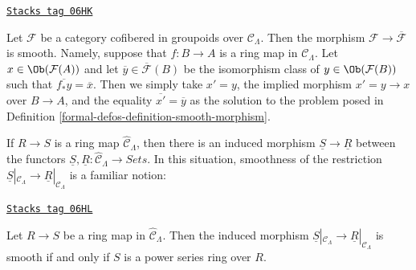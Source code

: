 \begin{remark}
\label{formal-defos-remark-smooth-to-iso-classes}
\href{https://stacks.math.columbia.edu/tag/06HK}{\texttt{Stacks tag 06HK}}

Let $\mathcal{F}$ be a category cofibered in groupoids over
$\mathcal{C}_\Lambda$. Then the morphism
$\mathcal{F} \to \overline{\mathcal{F}}$ is smooth.
Namely, suppose that $f : B \to A$ is a ring map in $\mathcal{C}_\Lambda$.
Let $x \in \Ob(\mathcal{F}(A))$ and let
$\overline{y} \in \overline{\mathcal{F}}(B)$
be the isomorphism class of $y \in \Ob(\mathcal{F}(B))$ such that
$\overline{f_*y} = \overline{x}$. Then we simply take $x' = y$, the
implied morphism $x' = y \to x$ over $B \to A$, and the equality
$\overline{x'} = \overline{y}$ as the solution to
the problem posed in Definition \ref{formal-defos-definition-smooth-morphism}.
\end{remark}

If $R \to S$ is a ring map $\widehat{\mathcal{C}}_\Lambda$, then there
is an induced morphism $\underline{S} \to \underline{R}$ between the
functors $\underline{S}, \underline{R}: \widehat{\mathcal{C}}_\Lambda
\to \textit{Sets}$.  In this situation, smoothness of the
restriction $\underline{S}|_{\mathcal{C}_\Lambda} \to
\underline{R}|_{\mathcal{C}_\Lambda}$ is a familiar notion:

\begin{lemma}
\label{formal-defos-lemma-smooth-morphism-power-series}
\href{https://stacks.math.columbia.edu/tag/06HL}{\texttt{Stacks tag 06HL}}

Let $R \to S$ be a ring map in $\widehat{\mathcal{C}}_\Lambda$. Then
the induced morphism
$\underline{S}|_{\mathcal{C}_\Lambda} \to \underline{R}|_{\mathcal{C}_\Lambda}$
is smooth if and only if $S$ is a power series ring over $R$.
\end{lemma}

